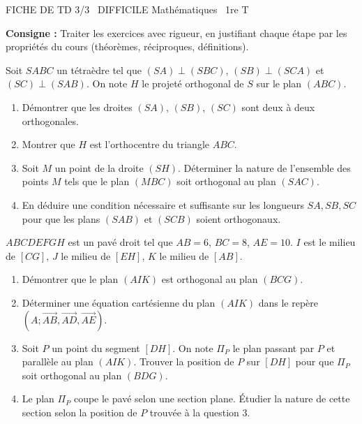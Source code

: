 \documentclass[11pt]{article}
\begin{document}
\begin{tcolorbox}[enhanced,colback=popink,colframe=popink,arc=10pt,boxrule=0pt,left=12pt,right=12pt,top=9pt,bottom=9pt]
{\color{white}\popxbold\small FICHE DE TD 3/3 \textbullet\ DIFFICILE \hfill Mathématiques \textbullet\ 1re T\par}
\end{tcolorbox}
\vspace{4pt}
\noindent \textbf{Consigne :} Traiter les exercices avec rigueur, en justifiant chaque étape par les propriétés du cours (théorèmes, réciproques, définitions).

\begin{exercice}
Soit $SABC$ un tétraèdre tel que $(SA) \perp (SBC)$, $(SB) \perp (SCA)$ et $(SC) \perp (SAB)$. On note $H$ le projeté orthogonal de $S$ sur le plan $(ABC)$.
\begin{enumerate}
    \item Démontrer que les droites $(SA)$, $(SB)$, $(SC)$ sont deux à deux orthogonales.
    \item Montrer que $H$ est l'orthocentre du triangle $ABC$.
    \item Soit $M$ un point de la droite $(SH)$. Déterminer la nature de l'ensemble des points $M$ tels que le plan $(MBC)$ soit orthogonal au plan $(SAC)$.
    \item En déduire une condition nécessaire et suffisante sur les longueurs $SA, SB, SC$ pour que les plans $(SAB)$ et $(SCB)$ soient orthogonaux.
\end{enumerate}
\end{exercice}

\begin{exercice}
$ABCDEFGH$ est un pavé droit tel que $AB = 6$, $BC = 8$, $AE = 10$. $I$ est le milieu de $[CG]$, $J$ le milieu de $[EH]$, $K$ le milieu de $[AB]$.
\begin{enumerate}
    \item Démontrer que le plan $(AIK)$ est orthogonal au plan $(BCG)$.
    \item Déterminer une équation cartésienne du plan $(AIK)$ dans le repère $(A; \overrightarrow{AB}, \overrightarrow{AD}, \overrightarrow{AE})$.
    \item Soit $P$ un point du segment $[DH]$. On note $\Pi_P$ le plan passant par $P$ et parallèle au plan $(AIK)$. Trouver la position de $P$ sur $[DH]$ pour que $\Pi_P$ soit orthogonal au plan $(BDG)$.
    \item Le plan $\Pi_P$ coupe le pavé selon une section plane. Étudier la nature de cette section selon la position de $P$ trouvée à la question 3.
\end{enumerate}
\end{exercice}
\end{document}
